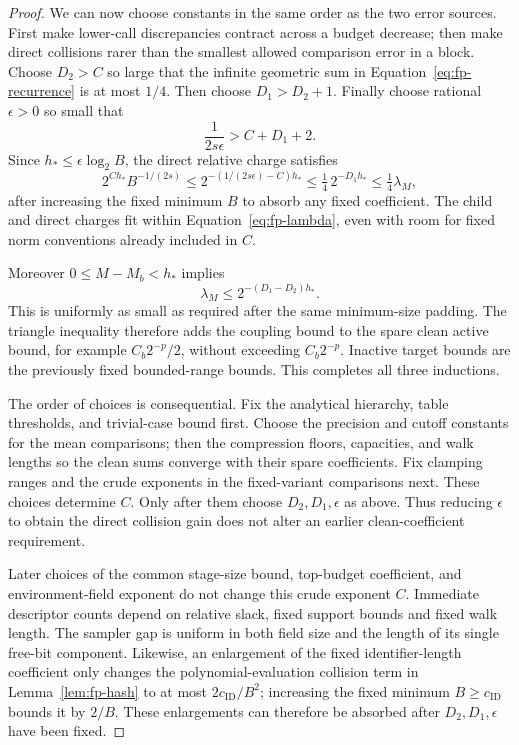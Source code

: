 \begin{proof}
We can now choose constants in the same order as the two error sources. First make lower-call discrepancies contract across a budget decrease; then make direct collisions rarer than the smallest allowed comparison error in a block. Choose $D_2>C$ so large that the infinite geometric sum in
Equation~\eqref{eq:fp-recurrence} is at most $1/4$.  Then choose
$D_1>D_2+1$.  Finally choose rational $\epsilon>0$ so small that
\begin{equation}
                  \frac1{2s\epsilon}>C+D_1+2.
 \label{eq:fp-epsilon}
\end{equation}
Since $h_*\le\epsilon\log_2B$, the direct relative charge satisfies
\[
 2^{C h_*}B^{-1/(2s)}
 \le 2^{-(1/(2s\epsilon)-C)h_*}
 \le\tfrac14\,2^{-D_1h_*}
 \le\tfrac14\lambda_M,
\]
after increasing the fixed minimum $B$ to absorb any fixed coefficient.
The child and direct charges fit within Equation~\eqref{eq:fp-lambda},
even with room for fixed norm conventions already included in $C$.

Moreover $0\le M-M_b<h_*$ implies
\[
              \lambda_M\le2^{-(D_1-D_2)h_*}.
\]
This is uniformly as small as required after the same minimum-size
padding.  The triangle inequality therefore adds the coupling bound to
the spare clean active bound, for example $C_b2^{-p}/2$, without
exceeding $C_b2^{-p}$.  Inactive target bounds are the previously fixed
bounded-range bounds.  This completes all three inductions.

The order of choices is consequential.  Fix the analytical hierarchy,
table thresholds, and trivial-case bound first.  Choose the precision
and cutoff constants for the mean comparisons; then the compression
floors, capacities, and walk lengths so the clean sums converge with
their spare coefficients.  Fix clamping ranges and the crude exponents
in the fixed-variant comparisons next.  These choices determine $C$.
Only after them choose $D_2,D_1,\epsilon$ as above.  Thus reducing
$\epsilon$ to obtain the direct collision gain does not alter an
earlier clean-coefficient requirement.

Later choices of the common stage-size bound, top-budget coefficient,
and environment-field exponent do not change this crude exponent $C$.
Immediate descriptor counts depend on relative slack, fixed support
bounds and fixed walk length.  The sampler gap is uniform in both
field size and the length of its single free-bit component.  Likewise,
an enlargement of the fixed identifier-length coefficient only changes
the polynomial-evaluation collision term in Lemma~\ref{lem:fp-hash} to at most
$2c_{\mathrm{ID}}/B^2$; increasing the fixed minimum
$B\ge c_{\mathrm{ID}}$ bounds it by $2/B$.  These enlargements can
therefore be absorbed after $D_2,D_1,\epsilon$ have been fixed.
\end{proof}


